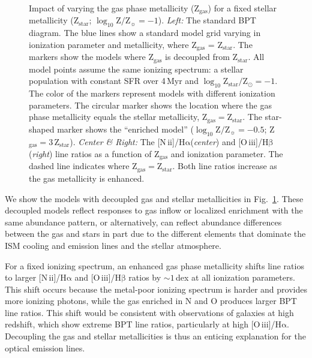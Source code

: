 \documentclass[preprint2]{aastex61}
\newcommand{\nii}{[N\,{\sc ii}]\xspace}
\newcommand{\oiii}{[O\,{\sc iii}]\xspace}
\newcommand{\ha}{\ensuremath{\mathrm{H\alpha}}\xspace}
\newcommand{\hb}{\ensuremath{\mathrm{H\beta}}\xspace}
\newcommand{\Myr}{$\,$Myr\xspace}
\newcommand{\logten}{\ensuremath{\log_{10}}}
\newcommand{\logZeq}[1]{\ensuremath{\logten \mathrm{Z}/\mathrm{Z}_{\sun} = #1}}
\begin{document}
\begin{figure}
  \begin{center}
    \caption{Impact of varying the gas phase metallicity (Z$_{\mathrm{gas}}$) for a fixed stellar metallicity (Z$_{\mathrm{star}}$; \logZeq{-1}). \emph{Left:} The standard BPT diagram. The blue lines show a standard model grid varying in ionization parameter and metallicity, where Z$_{\mathrm{gas}}$ = Z$_{\mathrm{star}}$. The markers show the models where Z$_{\mathrm{gas}}$ is decoupled from Z$_{\mathrm{star}}$.  All model points assume the same ionizing spectrum: a stellar population with constant SFR over 4\Myr and $\log_{10} \mathrm{Z}_{\mathrm{star}}/\mathrm{Z}_{\odot} = -1$. The color of the markers represent models with different ionization parameters. The circular marker shows the location where the gas phase metallicity equals the stellar metallicity, Z$_{\mathrm{gas}}=$Z$_{\mathrm{star}}$. The star-shaped marker shows the ``enriched model'' (\logZeq{-0.5}; Z$_{\mathrm{gas}}=3\,$Z$_{\mathrm{star}}$). \emph{Center \& Right:} The \nii/\ha (\emph{center}) and \oiii/\hb (\emph{right}) line ratios as a function of Z$_{\mathrm{gas}}$ and ionization parameter. The dashed line indicates where $\mathrm{Z}_{\mathrm{gas}}=\mathrm{Z}_{\mathrm{star}}$. Both line ratios increase as the gas metallicity is enhanced.}
    \label{fig:diffZ}
  \end{center}
\end{figure}

We show the models with decoupled gas and stellar metallicities in Fig.~\ref{fig:diffZ}. These decoupled models reflect responses to gas inflow or localized enrichment with the same abundance pattern, or alternatively, can reflect abundance differences between the gas and stars in part due to the different elements that dominate the ISM cooling and emission lines and the stellar atmosphere.

For a fixed ionizing spectrum, an enhanced gas phase metallicity shifts line ratios to larger \nii/\ha and \oiii/\hb ratios by ${\sim}1\,$dex at all ionization parameters. This shift occurs because the metal-poor ionizing spectrum is harder and provides more ionizing photons, while the gas enriched in N and O produces larger BPT line ratios. This shift would be consistent with observations of galaxies at high redshift, which show extreme BPT line ratios, particularly at high \oiii/\ha.  Decoupling the gas and stellar metallicities is thus an enticing explanation for the optical emission lines.
\end{document}
